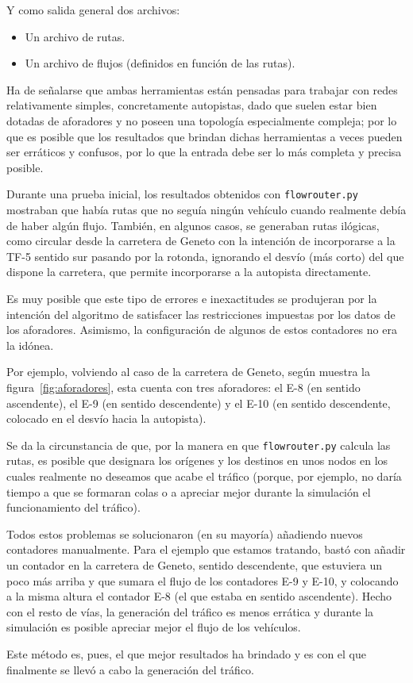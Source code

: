 Y como salida general dos archivos:

\begin{itemize}
    \item Un archivo de rutas.
    \item Un archivo de flujos (definidos en función de las rutas).
\end{itemize}

Ha de señalarse que ambas herramientas están pensadas para trabajar con redes relativamente simples, concretamente autopistas, dado que suelen estar bien dotadas de aforadores y no poseen una topología especialmente compleja; por lo que es posible que los resultados que brindan dichas herramientas a veces pueden ser erráticos y confusos, por lo que la entrada debe ser lo más completa y precisa posible.

Durante una prueba inicial, los resultados obtenidos con \texttt{flowrouter.py} mostraban que había rutas que no seguía ningún vehículo cuando realmente debía de haber algún flujo. También, en algunos casos, se generaban rutas ilógicas, como circular desde la carretera de Geneto con la intención de incorporarse a la TF-5 sentido sur pasando por la rotonda, ignorando el desvío (más corto) del que dispone la carretera, que permite incorporarse a la autopista directamente.

Es muy posible que este tipo de errores e inexactitudes se produjeran por la intención del algoritmo de satisfacer las restricciones impuestas por los datos de los aforadores. Asimismo, la configuración de algunos de estos contadores no era la idónea. 

Por ejemplo, volviendo al caso de la carretera de Geneto, según muestra la figura~\ref{fig:aforadores}, esta cuenta con tres aforadores: el E-8 (en sentido ascendente), el E-9 (en sentido descendente) y el E-10 (en sentido descendente, colocado en el desvío hacia la autopista).

Se da la circunstancia de que, por la manera en que \texttt{flowrouter.py} calcula las rutas, es posible que designara los orígenes y los destinos en unos nodos en los cuales realmente no deseamos que acabe el tráfico (porque, por ejemplo, no daría tiempo a que se formaran colas o a apreciar mejor durante la simulación el funcionamiento del tráfico).

Todos estos problemas se solucionaron (en su mayoría) añadiendo nuevos contadores manualmente. Para el ejemplo que estamos tratando, bastó con añadir un contador en la carretera de Geneto, sentido descendente, que estuviera un poco más arriba y que sumara el flujo de los contadores E-9 y E-10, y colocando a la misma altura el contador E-8 (el que estaba en sentido ascendente). Hecho con el resto de vías, la generación del tráfico es menos errática y durante la simulación es posible apreciar mejor el flujo de los vehículos.

Este método es, pues, el que mejor resultados ha brindado y es con el que finalmente se llevó a cabo la generación del tráfico.